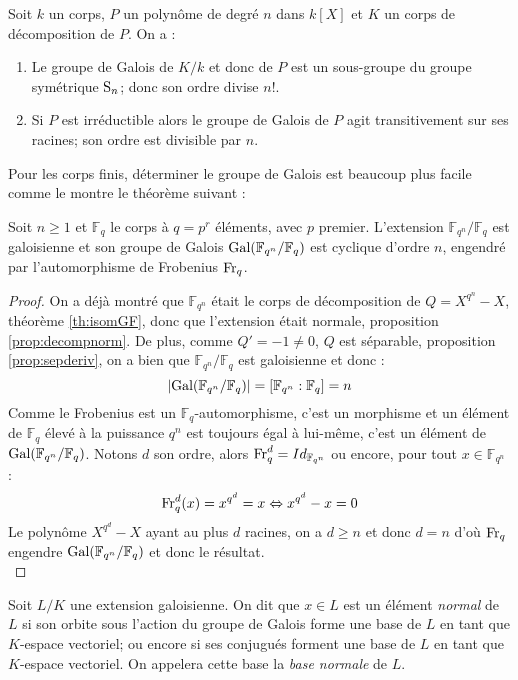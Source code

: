 \documentclass[a4paper]{article} %
\numberwithin{section}{part}
\numberwithin{equation}{section}
\newcommand\GF[1]{\mathbb{F}_{#1}}
\begin{document}
\begin{thm} Soit $k$ un corps, $P$ un polynôme de degré $n$ dans $k[X]$ et $K$ 
un corps de décomposition de $P$. On a :
\begin{enumerate}
\item Le groupe de Galois de $K/k$ et donc de $P$ est un sous-groupe du groupe
symétrique $\textup{S}_n$; donc son ordre divise $n!$.
\item Si $P$ est irréductible alors le groupe de Galois de $P$ agit
transitivement sur ses racines; son ordre est divisible par $n$.
\end{enumerate}
\end{thm}

Pour les corps finis, déterminer le groupe de Galois est beaucoup plus facile
comme le montre le théorème suivant :

\begin{thm}
Soit $n\geq1$ et $\GF{q}$ le corps à $q=p^r$ éléments, avec $p$ premier.
L'extension $\GF{q^n}/\GF{q}$ est galoisienne et son groupe de Galois
$\textup{Gal}(\GF{q^n}/\GF{q})$ est cyclique d'ordre $n$, engendré par 
l'automorphisme de Frobenius $\textup{Fr}_q$.
\end{thm}
\begin{proof}
On a déjà montré que $\GF{q^n}$ était le corps de décomposition de $Q = X^{q^n} 
- X$, théorème \ref{th:isomGF}, donc que l'extension était normale, proposition 
\ref{prop:decompnorm}. De plus, comme $Q' = -1 \neq 0$, $Q$ est séparable,
proposition \ref{prop:sepderiv}, on a bien que $\GF{q^n}/\GF{q}$ est galoisienne
et donc :
\[|\textup{Gal}(\GF{q^n}/\GF{q})| = [\GF{q^n}:\GF{q}] = n\]
Comme le Frobenius est un $\GF{q}$-automorphisme, c'est un morphisme et un 
élément de $\GF{q}$ élevé à la puissance $q^n$ est toujours égal à lui-même, 
c'est un élément de $\textup{Gal}(\GF{q^n}/\GF{q})$. Notons $d$ son ordre, alors
$\textup{Fr}_q^d = Id_{\GF{q^n}}$ ou encore, pour tout $x\in\GF{q^n}$ :
\[\textup{Fr}_q^d(x) = x^{q^d} = x \Leftrightarrow x^{q^d} - x = 0\]
Le polynôme $X^{q^d} - X$ ayant au plus $d$ racines, on a $d\geq n$ et donc $d =
n$ d'où $\textup{Fr}_q$ engendre $\textup{Gal}(\GF{q^n}/\GF{q})$ et donc le
résultat.\\
\end{proof}

\begin{defn}
\label{def:elemnorm}
Soit $L/K$ une extension galoisienne. On dit que $x\in L$ est un élément
\emph{normal} de $L$ si son orbite sous l'action du groupe de Galois forme une 
base de $L$ en tant que $K$-espace vectoriel; ou encore si ses conjugués forment
une base de $L$ en tant que $K$-espace vectoriel. On appelera cette base la 
\emph{base normale} de $L$.
\end{defn}
\end{document}
